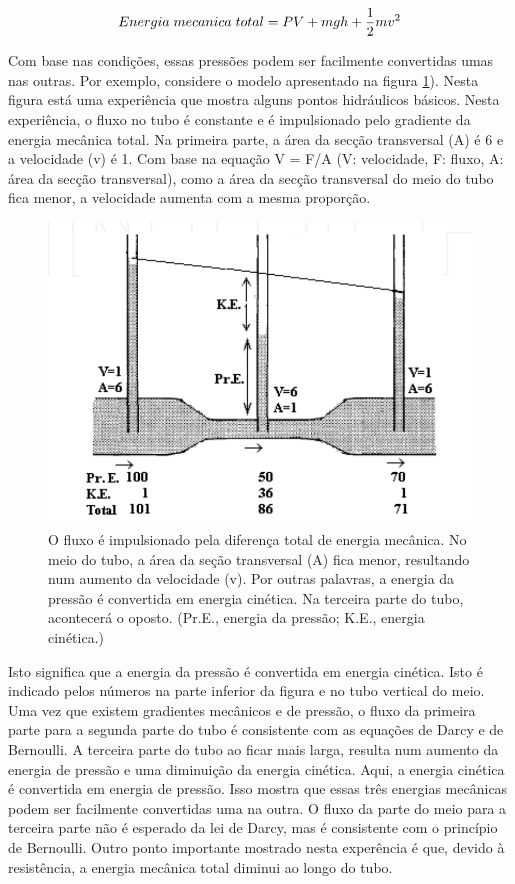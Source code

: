 \documentclass[
  portuguese,
  ]{book}
\begin{document}
\begin{equation}
Energia \hspace{0.1cm}mecanica\hspace{0.1cm} total = PV + mgh + \frac{1}{2}mv^2
\label{eq:bernoulli}
\end{equation}

Com base nas condições, essas pressões podem ser facilmente convertidas umas nas outras. Por exemplo, considere o modelo apresentado na figura \ref{fig:imghemo4}). Nesta figura está uma experiência que mostra alguns pontos hidráulicos básicos. Nesta experiência, o fluxo no tubo é constante e é impulsionado pelo gradiente da energia mecânica total. Na primeira parte, a área da secção transversal (A) é 6 e a velocidade (v) é 1. Com base na equação V = F/A (V: velocidade, F: fluxo, A: área da secção transversal), como a área da secção transversal do meio do tubo fica menor, a velocidade aumenta com a mesma proporção.

\begin{figure}
\centering
\includegraphics{img/hemo_4.png}
\caption{\label{fig:imghemo4}O fluxo é impulsionado pela diferença total de energia mecânica. No meio do tubo, a área da seção transversal (A) fica menor, resultando num aumento da velocidade (v). Por outras palavras, a energia da pressão é convertida em energia cinética. Na terceira parte do tubo, acontecerá o oposto. (Pr.E., energia da pressão; K.E., energia cinética.)}
\end{figure}

Isto significa que a energia da pressão é convertida em energia cinética. Isto é indicado pelos números na parte inferior da figura e no tubo vertical do meio. Uma vez que existem gradientes mecânicos e de pressão, o fluxo da primeira parte para a segunda parte do tubo é consistente com as equações de Darcy e de Bernoulli. A terceira parte do tubo ao ficar mais larga, resulta num aumento da energia de pressão e uma diminuição da energia cinética. Aqui, a energia cinética é convertida em energia de pressão. Isso mostra que essas três energias mecânicas podem ser facilmente convertidas uma na outra. O fluxo da parte do meio para a terceira parte não é esperado da lei de Darcy, mas é consistente com o princípio de Bernoulli. Outro ponto importante mostrado nesta experência é que, devido à resistência, a energia mecânica total diminui ao longo do tubo.
\end{document}
